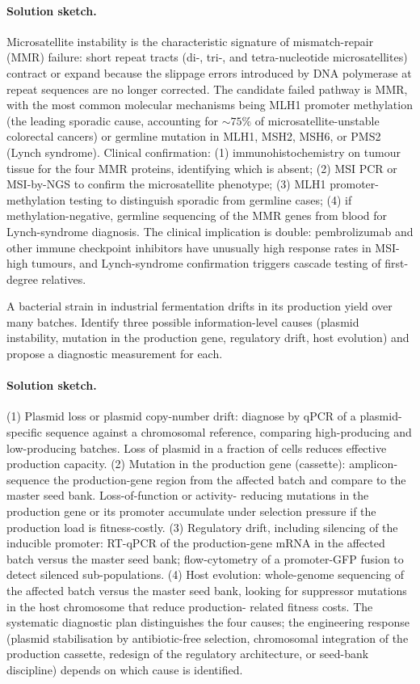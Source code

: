 \paragraph{Solution sketch.} Microsatellite instability is the
characteristic signature of mismatch-repair (MMR) failure: short
repeat tracts (di-, tri-, and tetra-nucleotide microsatellites)
contract or expand because the slippage errors introduced by DNA
polymerase at repeat sequences are no longer corrected. The
candidate failed pathway is MMR, with the most common molecular
mechanisms being MLH1 promoter methylation (the leading sporadic
cause, accounting for $\sim 75\%$ of microsatellite-unstable colorectal
cancers) or germline mutation in MLH1, MSH2, MSH6, or PMS2 (Lynch
syndrome). Clinical confirmation: (1) immunohistochemistry on tumour
tissue for the four MMR proteins, identifying which is absent;
(2) MSI PCR or MSI-by-NGS to confirm the microsatellite phenotype;
(3) MLH1 promoter-methylation testing to distinguish sporadic from
germline cases; (4) if methylation-negative, germline sequencing of
the MMR genes from blood for Lynch-syndrome diagnosis. The clinical
implication is double: pembrolizumab and other immune checkpoint
inhibitors have unusually high response rates in MSI-high tumours,
and Lynch-syndrome confirmation triggers cascade testing of
first-degree relatives.

\begin{exercise}
A bacterial strain in industrial fermentation drifts in its
production yield over many batches. Identify three possible
information-level causes (plasmid instability, mutation in the
production gene, regulatory drift, host evolution) and propose a
diagnostic measurement for each.
\end{exercise}

\paragraph{Solution sketch.} (1) Plasmid loss or plasmid copy-number
drift: diagnose by qPCR of a plasmid-specific sequence against a
chromosomal reference, comparing high-producing and low-producing
batches. Loss of plasmid in a fraction of cells reduces effective
production capacity. (2) Mutation in the production gene (cassette):
amplicon-sequence the production-gene region from the affected batch
and compare to the master seed bank. Loss-of-function or activity-
reducing mutations in the production gene or its promoter accumulate
under selection pressure if the production load is fitness-costly.
(3) Regulatory drift, including silencing of the inducible promoter:
RT-qPCR of the production-gene mRNA in the affected batch versus the
master seed bank; flow-cytometry of a promoter-GFP fusion to detect
silenced sub-populations. (4) Host evolution: whole-genome sequencing
of the affected batch versus the master seed bank, looking for
suppressor mutations in the host chromosome that reduce production-
related fitness costs. The systematic diagnostic plan distinguishes
the four causes; the engineering response (plasmid stabilisation by
antibiotic-free selection, chromosomal integration of the production
cassette, redesign of the regulatory architecture, or seed-bank
discipline) depends on which cause is identified.

